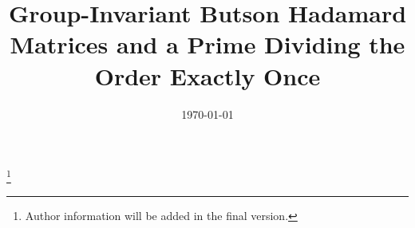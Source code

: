 \documentclass[11pt]{amsart}
\begin{document}
\title[A prime dividing the order once]{Group-Invariant Butson Hadamard Matrices and a Prime Dividing the Order Exactly Once}

\author{}\thanks{Author information will be added in the final version.}

\date{\today}


\begin{abstract}

\end{abstract}

\maketitle












\end{document}
